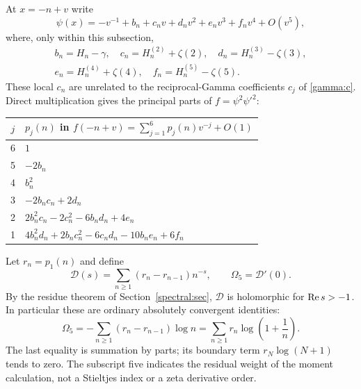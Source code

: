 At $x=-n+v$ write
\[
 \psi(x)=-v^{-1}+b_n+c_nv+d_nv^2+e_nv^3+f_nv^4+O(v^5),
\]
where, only within this subsection,
\begin{equation}\label{sixth:locals}
 \begin{gathered}
 b_n=H_n-\gamma,\quad c_n=H_n^{(2)}+\zeta(2),\quad
 d_n=H_n^{(3)}-\zeta(3),\\
 e_n=H_n^{(4)}+\zeta(4),\quad f_n=H_n^{(5)}-\zeta(5).
 \end{gathered}
\end{equation}
These local $c_n$ are unrelated to the reciprocal-Gamma coefficients
$c_j$ of \eqref{gamma:c}.  Direct multiplication gives the principal
parts of $f=\psi^2\psi'^2$:
\begin{center}
\begin{tabular}{@{}cl@{}}
\toprule
$j$ & $p_j(n)$ in $f(-n+v)=\sum_{j=1}^6p_j(n)v^{-j}+O(1)$ \\
\midrule
6 & $1$ \\
5 & $-2b_n$ \\
4 & $b_n^2$ \\
3 & $-2b_nc_n+2d_n$ \\
2 & $2b_n^2c_n-2c_n^2-6b_nd_n+4e_n$ \\
1 & $4b_n^2d_n+2b_nc_n^2-6c_nd_n-10b_ne_n+6f_n$ \\
\bottomrule
\end{tabular}
\end{center}
Let $r_n=p_1(n)$ and define
\begin{equation}\label{sixth:D}
 \mathcal D(s)=\sum_{n\ge1}(r_n-r_{n-1})n^{-s},\qquad
 \Omega_5=\mathcal D'(0).
\end{equation}
By the residue theorem of Section~\ref{spectral:sec}, $\mathcal D$
is holomorphic for $\operatorname{Re} s>-1$.  In particular these are ordinary
absolutely convergent identities:
\begin{equation}\label{sixth:omega-series}
 \boxed{\displaystyle
 \Omega_5=-\sum_{n\ge1}(r_n-r_{n-1})\log n
             =\sum_{n\ge1}r_n\log\left(1+\frac1n\right).}
\end{equation}
The last equality is summation by parts; its boundary term
$r_N\log(N+1)$ tends to zero.
The subscript five indicates the residual weight of the moment
calculation, not a Stieltjes index or a zeta derivative order.

